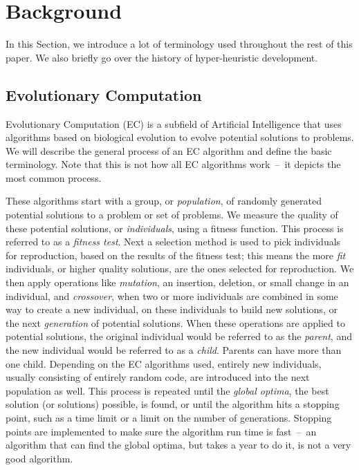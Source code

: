 \documentclass{sig-alternate}
\begin{document}
\section{Background}
\label{sec:background}
In this Section, we introduce a lot of terminology used throughout the rest of this paper. We also briefly go over the history of hyper-heuristic development.

\subsection{Evolutionary Computation}
\label{sec:evocomp}
Evolutionary Computation (EC) is a subfield of Artificial Intelligence that uses algorithms based on biological evolution to evolve potential solutions to problems. We will describe the general process of an EC algorithm and define the basic terminology. Note that this is not how all EC algorithms work~--~it depicts the most common process.

These algorithms start with a group, or \textit{population}, of randomly generated potential solutions to a problem or set of problems. We measure the quality of these potential solutions, or \textit{individuals}, using a fitness function. This process is referred to as a \textit{fitness test}. Next a selection method is used to pick individuals for reproduction, based on the results of the fitness test; this means the more \textit{fit} individuals, or higher quality solutions, are the ones selected for reproduction. We then apply operations like \textit{mutation}, an insertion, deletion, or small change in an individual, and \textit{crossover}, when two or more individuals are combined in some way to create a new individual, on these individuals to build new solutions, or the next \textit{generation} of potential solutions. When these operations are applied to potential solutions, the original individual would be referred to as the \textit{parent}, and the new individual would be referred to as a \textit{child}. Parents can have more than one child. Depending on the EC algorithms used, entirely new individuals, usually consisting of entirely random code, are introduced into the next population as well. This process is repeated until the \textit{global optima}, the best solution (or solutions) possible, is found, or until the algorithm hits a stopping point, such as a time limit or a limit on the number of generations. Stopping points are implemented to make sure the algorithm run time is fast~--~an algorithm that can find the global optima, but takes a year to do it, is not a very good algorithm.
\end{document}
